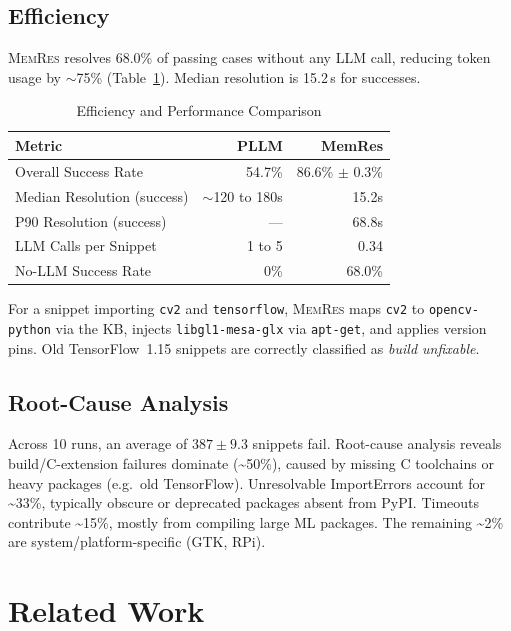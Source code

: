 \documentclass[sigconf,screen]{acmart}
\begin{document}
\subsection{Efficiency}
\textsc{MemRes} resolves 68.0\% of passing cases without any LLM call, reducing token usage by $\sim$75\% (Table~\ref{tab:efficiency}). Median resolution is 15.2\,s for successes.

\begin{table}[h]
\caption{Efficiency and Performance Comparison}
\label{tab:efficiency}
\begin{tabular}{lrr}
\toprule
\textbf{Metric} & \textbf{PLLM} & \textbf{MemRes} \\
\midrule
Overall Success Rate & 54.7\% & 86.6\% $\pm$ 0.3\% \\
Median Resolution (success) & $\sim$120 to 180s & 15.2s \\
P90 Resolution (success) & --- & 68.8s \\
LLM Calls per Snippet & 1 to 5 & 0.34 \\
No-LLM Success Rate & 0\% & 68.0\% \\
\bottomrule
\end{tabular}
\end{table}

For a snippet importing \texttt{cv2} and \texttt{tensorflow}, \textsc{MemRes} maps \texttt{cv2} to \texttt{opencv-python} via the KB, injects \texttt{libgl1-mesa-glx} via \texttt{apt-get}, and applies version pins. Old TensorFlow~1.15 snippets are correctly classified as \emph{build unfixable}.

\subsection{Root-Cause Analysis}
Across 10 runs, an average of $387 \pm 9.3$ snippets fail.
Root-cause analysis reveals build/C-extension failures dominate (\textasciitilde50\%), caused by missing C toolchains or heavy packages (e.g.\ old TensorFlow). Unresolvable ImportErrors account for \textasciitilde33\%, typically obscure or deprecated packages absent from PyPI. Timeouts contribute \textasciitilde15\%, mostly from compiling large ML packages. The remaining \textasciitilde2\% are system/platform-specific (GTK, RPi).

\section{Related Work}
\label{sec:related}
\end{document}
